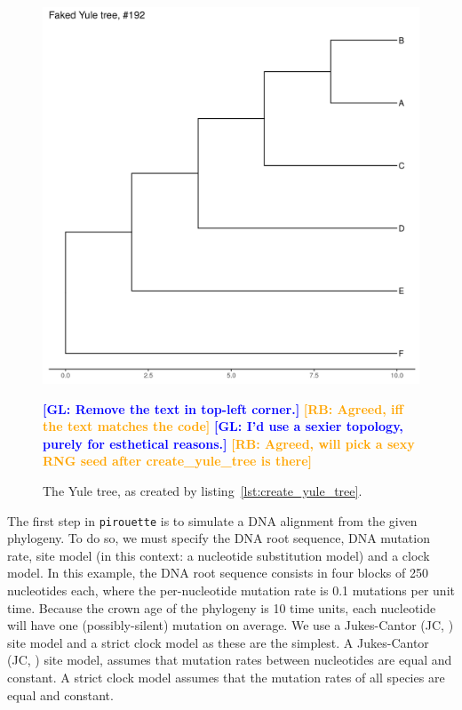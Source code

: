 \documentclass{article}
\newcommand{\giovanni}[1]{\textcolor{blue}{\textbf{[GL: #1]}}}
\newcommand{\richel}[1]{\textcolor{orange}{\textbf{[RB: #1]}}}
\begin{document}
\begin{figure}[ht]
  \includegraphics[width=\textwidth]{tree_yule.png}
  \caption{The Yule tree, as created by listing~\ref{lst:create_yule_tree}.}
  \label{fig:yule_tree}
  \giovanni{Remove the text in top-left corner.}
  \richel{Agreed, iff the text matches the code}
  \giovanni{I'd use a sexier topology, purely for esthetical reasons.}
  \richel{Agreed, will pick a sexy RNG seed after create\_yule\_tree is there}
\end{figure}

The first step in \verb;pirouette; is to simulate a DNA alignment from the given phylogeny. 
To do so, we must specify the DNA root sequence, DNA mutation rate,
site model (in this context: a nucleotide substitution model) and a clock model. 
In this example, the DNA root sequence consists in four blocks of 250 nucleotides each, 
where the per-nucleotide mutation rate is 0.1 mutations per unit time.
Because the crown age of the phylogeny is 10 time units, each nucleotide will
have one (possibly-silent) mutation on average.
We use a Jukes-Cantor (JC, \cite{jukes1969evolution}) site model
and a strict clock model as these are the simplest.
A Jukes-Cantor (JC, \cite{jukes1969evolution}) site model,
assumes that mutation rates between nucleotides are equal and constant. 
A strict clock model assumes that the mutation rates 
of all species are equal and constant.
\end{document}
